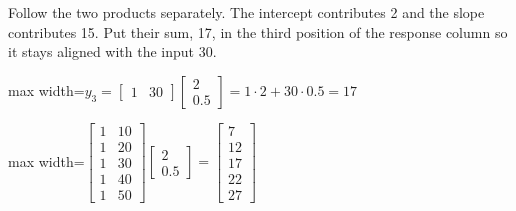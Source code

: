\documentclass[11pt,a4paper]{article}
\begin{document}
Follow the two products separately. The intercept contributes 2 and the slope contributes 15. Put their sum, 17, in the third position of the response column so it stays aligned with the input 30.
\begin{center}\begin{adjustbox}{max width=\linewidth}$\displaystyle y_3=\begin{bmatrix}1&30\end{bmatrix}\begin{bmatrix}2\\0.5\end{bmatrix}=1\cdot2+30\cdot0.5=17$\end{adjustbox}\end{center}


\begin{center}\begin{adjustbox}{max width=\linewidth}$\displaystyle \begin{bmatrix}1&10\\1&20\\1&30\\1&40\\1&50\end{bmatrix}\begin{bmatrix}2\\0.5\end{bmatrix}=\begin{bmatrix}7\\12\\17\\22\\27\end{bmatrix}$\end{adjustbox}\end{center}
\end{document}
